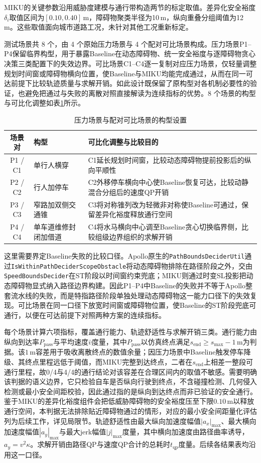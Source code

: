 \documentclass[a4paper,11pt]{ctexart}
\theoremstyle{definition}
\begin{document}
MIKU的关键参数沿用威胁度建模与通行带构造两节的标定取值。差异化安全裕度$\delta_i$取值区间为$[0.10, 0.40]$\,m，障碍物聚类半径为10\,m，纵向重叠分组阈值为12\,m。这些取值面向城市道路工况，未针对其他工况重新标定。

测试场景共 8 个，由 4 个原始压力场景与 4 个配对可比场景构成。压力场景P1--P4保留临界构型，用于暴露Baseline在动态障碍物、统一安全裕度与逐障碍物贪心决策三类配置下的失效边界。可比场景C1--C4逐一复制对应压力场景，仅轻量调整规划时间窗或障碍物横向位置，使Baseline与MIKU均能完成通过，从而在同一可达前提下比较轨迹质量与求解开销。如此设计既保留了原构型对各机制必要性的验证，也避免把通过与失败的离散对照直接解读为连续指标的优势。8 个场景的构型与可比化调整如表\ref{tab:exp_scenarios}所示。

\begin{table}[htbp]
\centering
\caption{压力场景与配对可比场景的构型设置}
\label{tab:exp_scenarios}
\small
\begin{tabular}{c l p{7.4cm}}
\toprule
\textbf{场景对} & \textbf{构型} & \textbf{可比化调整与比较目的} \\
\midrule
P1 / C1 & 单行人横穿 & C1延长规划时间窗，比较动态障碍物提前投影后的纵向平顺性 \\
P2 / C2 & 行人加停车 & C2外移停车横向中心使Baseline恢复可达，比较动静混合分组后的速度QP开销 \\
P3 / C3 & 窄路加双侧交通锥 & C3将对称锥列改为轻微非对称使Baseline可通过，保留差异化裕度释放通行空间 \\
P4 / C4 & 单车道维修封闭加借道 & C4将水马横向中心调至Baseline贪心切换临界侧，比较组级边界组织的求解开销 \\
\bottomrule
\end{tabular}
\end{table}

这里需要界定Baseline失败的比较口径。Apollo原生的\texttt{PathBoundsDeciderUtil}通过\texttt{IsWithinPathDeciderScopeObstacle}将动态障碍物排除在路径阶段之外，交由\texttt{SpeedBoundsDecider}在ST阶段以时间窗约束兜底；MIKU则通过时变SL投影把动态障碍物显式纳入路径边界构建。因此P1--P4中Baseline的失败并不等于Apollo整套流水线的失败，而是特指路径阶段单独处理动态障碍物这一能力口径下的失效复现。可比场景在同一口径下放宽时间窗或障碍物位置，使Baseline的ST阶段兜底可通行，以便在可达前提下对照两种方案的连续指标。

每个场景计算六项指标，覆盖通行能力、轨迹舒适性与求解开销三类。通行能力由纵向到达率$P_{\mathrm{pass}}$与平均速度$\bar v$度量，其中$P_{\mathrm{pass}}$以仿真终点满足$s_{\mathrm{end}} \geq s_{\max} - 1$\,m为判据。该$1$\,m容差用于吸收离散终点的数值余量；因压力场景中Baseline触发停车降级、其终点里程远低于阈值，而MIKU完整到达终点，二者在$s_{\mathrm{end}}$上相差一整段可通行里程，故0/4与4/4的通行结论对该容差在合理区间内的取值不敏感。需要明确该判据的语义边界，它只检验自车是否纵向行驶到终点，不含碰撞检测、几何侵入检测或最小安全间距校验，因此通过指的是纵向到达终点而非已验证的安全通行。鉴于MIKU的差异化裕度组件会把低威胁障碍物的安全裕度压至下限$0.10$\,m以释放通行空间，本判据无法排除贴近障碍物通过的情形，对应的最小安全间距量化评估列为后续工作，详见局限节。轨迹舒适性由最大纵向加速度幅值$|a_x|_{\max}$、最大横向加速度幅值$|a_y|_{\max}$与最大jerk幅值$|j|_{\max}$度量，其中横向加速度由路径曲率诱导，$a_y = v^2 \kappa$。求解开销由路径QP与速度QP合计的总耗时$t_{\mathrm{qp}}$度量。后续各结果表均沿用这一口径。
\end{document}
